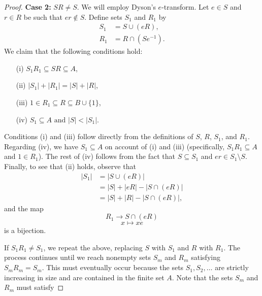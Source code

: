 \documentclass[11pt]{amsart}
\theoremstyle{definition}
\theoremstyle{remark}
\begin{document}
\begin{proof}
{\bf Case 2:} \( SR \neq S\).  We will employ Dyson's \( e \)-transform.  Let \( e \in S \) and \( r \in R \) be such that \( er \notin S \).  Define sets \( S_1 \) and \( R_1 \) by
\begin{align*}
 S_1 &= S \cup (eR), \\
R_1 &= R \cap (Se^{-1}).
\end{align*}
We claim that the following conditions hold:
\begin{itemize}
\item[(i)] \( S_1R_1 \subseteq SR \subseteq A \),
\item[(ii)] \( |S_1| + |R_1| = |S| + |R| \),
\item[(iii)] \( 1 \in R_1 \subseteq R \subseteq B \cup \{ 1 \}\),
\item[(iv)] \( S_1 \subseteq A \mbox{ and }|S| < |S_1|. \)
\end{itemize}
Conditions (i) and (iii) follow directly from the definitions of \( S \), \( R \), \( S_1 \), and \( R_1 \). Regarding (iv), we have \( S_1 \subseteq A \) on account of (i) and (iii) (specifically, \( S_1R_1 \subseteq A \) and \( 1 \in R_1 \)).  The rest of (iv) follows from the fact that \( S \subseteq S_1 \) and \( er \in S_1 \setminus S \).  Finally, to see that (ii) holds, observe that 
\begin{align*}
|S_1| &= |S \cup (eR)| \\
&= |S| + |eR| - |S \cap (eR)| \\
&= |S| + |R| - |S \cap (eR)|,
\end{align*}
and the map 
\[ R_1 \longrightarrow S \cap (eR) \]
\[ x \mapsto xe \]
is a bijection. 

If \( S_1R_1 \neq S_1 \), we repeat the above, replacing \( S \) with \( S_1 \) and \( R \) with \( R_1 \).  The process continues until we reach nonempty sets \( S_m \) and \( R_m \) satisfying \( S_mR_m = S_m \). This must eventually occur because the sets \( S_1, S_2, \ldots \) are strictly increasing in size and are contained in the finite set \( A \).  Note that the sets \( S_m \) and \( R_m \) must satisfy


\end{proof}
\end{document}
